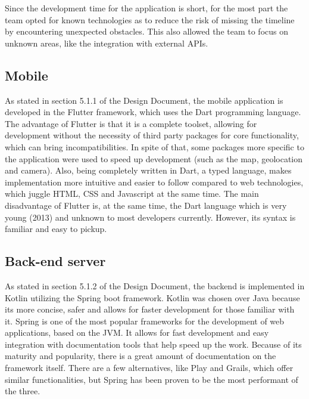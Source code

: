 Since the development time for the application is short, for the most part the team opted for known technologies as to reduce the risk of missing the timeline by encountering unexpected obstacles. This also allowed the team to focus on unknown areas, like the integration with external APIs.\\

\subsection{Mobile}
As stated in section 5.1.1 of the Design Document, the mobile application is developed in the Flutter framework, which uses the Dart programming language.
The advantage of Flutter is that it is a complete toolset, allowing for development without the necessity of third party packages for core functionality, which can bring incompatibilities. In spite of that, some packages more specific to the application were used to speed up development (such as the map, geolocation and camera). Also, being completely written in Dart, a typed language, makes implementation more intuitive and easier to follow compared to web technologies, which juggle HTML, CSS and Javascript at the same time.
The main disadvantage of Flutter is, at the same time, the Dart language which is very young (2013) and unknown to most developers currently. However, its syntax is familiar and easy to pickup.

\subsection{Back-end server}

As stated in section 5.1.2 of the Design Document, the backend is implemented in Kotlin utilizing the Spring boot framework.
Kotlin was chosen over Java because its more concise, safer and allows for faster development for those familiar with it.
Spring is one of the most popular frameworks for the development of web applications, based on the JVM. It allows for fast development and easy integration with documentation tools that help speed up the work. Because of its maturity and popularity, there is a great amount of documentation on the framework itself. There are a few alternatives, like Play and Grails, which offer similar functionalities, but Spring has been proven to be the most performant of the three.
